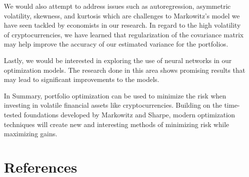 \documentclass[12pt]{article} %
\begin{document}
We would also attempt to address issues such as autoregression, asymmetric volatility, skewness, and kurtosis which are challenges to Markowitz’s model we have seen tackled by economists in our research. In regard to the high volatility of cryptocurrencies, we have learned that regularization of the covariance matrix may help improve the accuracy of our estimated variance for the portfolios.

Lastly, we would be interested in exploring the use of neural networks in our optimization models. The research done in this area shows promising results that may lead to significant improvements to the models.

In Summary, portfolio optimization can be used to minimize the risk when investing in volatile financial assets like cryptocurrencies. Building on the time-tested foundations developed by Markowitz and Sharpe, modern optimization techniques will create new and interesting methods of minimizing risk while maximizing gains.

\pagebreak

\section*{References}
\end{document}
